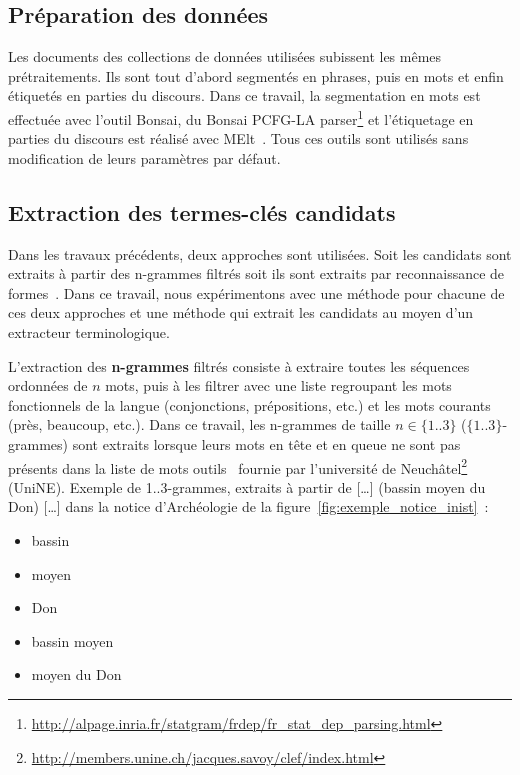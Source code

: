   \subsection{Préparation des données}
  \label{subsec:preparation_des_donnees}
    Les documents des collections de données utilisées subissent les mêmes
    prétraitements. Ils sont tout d'abord segmentés en phrases, puis en mots et
    enfin étiquetés en parties du discours. Dans ce travail, la segmentation en
    mots est effectuée avec l'outil Bonsai, du Bonsai PCFG-LA
    parser\footnote{\url{http://alpage.inria.fr/statgram/frdep/fr_stat_dep_parsing.html}}
    et l'étiquetage en parties du discours est réalisé avec
    MElt~\cite{denis2009melt}. Tous ces outils sont utilisés sans modification
    de leurs paramètres par défaut.

  \subsection{Extraction des termes-clés candidats}
  \label{subsec:extraction_de_termes_cles_candidats}
    Dans les travaux précédents, deux approches sont utilisées. Soit les
    candidats sont extraits à partir des n-grammes filtrés soit ils sont
    extraits par reconnaissance de formes~\cite{hulth2003keywordextraction}.
    Dans ce travail, nous expérimentons avec une méthode pour chacune de ces
    deux approches et une méthode qui extrait les candidats au moyen d'un
    extracteur terminologique.

    L'extraction des \textbf{n-grammes} filtrés consiste à extraire toutes les
    séquences ordonnées de $n$ mots, puis à les filtrer avec une liste
    regroupant les mots fonctionnels de la langue (conjonctions, prépositions,
    etc.) et les mots courants (\og{}près\fg{}, \og{}beaucoup\fg{}, etc.). Dans
    ce travail, les n-grammes de taille $n \in \{1..3\}$ ($\{1..3\}$-grammes)
    sont extraits lorsque leurs mots en tête et en queue ne sont pas présents
    dans la liste de mots outils~\cite{witten1999kea} fournie par l'université
    de
    Neuchâtel\footnote{\url{http://members.unine.ch/jacques.savoy/clef/index.html}}
    (UniNE). Exemple de {1..3}-grammes, extraits à partir de \og{}[\dots]
    (bassin moyen du Don) [\dots]\fg{} dans la notice d'Archéologie de la
    figure~\ref{fig:exemple_notice_inist}~:
    \begin{itemize}
      \item{\og{}bassin\fg{}}
      \item{\og{}moyen\fg{}}
      \item{\og{}Don\fg{}}
      \item{\og{}bassin moyen\fg{}}
      \item{\og{}moyen du Don\fg{}}
    \end{itemize}

